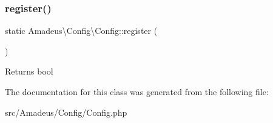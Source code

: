 \subsubsection{\texorpdfstring{register()}{register()}}
{\footnotesize\ttfamily static Amadeus\textbackslash{}\+Config\textbackslash{}\+Config\+::register (\begin{DoxyParamCaption}{ }\end{DoxyParamCaption})\hspace{0.3cm}{\ttfamily [static]}}

\begin{DoxyReturn}{Returns}
bool 
\end{DoxyReturn}


The documentation for this class was generated from the following file\+:\begin{DoxyCompactItemize}
\item 
src/\+Amadeus/\+Config/Config.\+php\end{DoxyCompactItemize}
